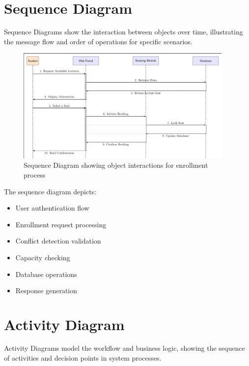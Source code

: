 \section{Sequence Diagram}

Sequence Diagrams show the interaction between objects over time, illustrating the message flow and order of operations for specific scenarios.

\begin{figure}[h]
    \centering
    \includegraphics[width=0.95\textwidth]{images/Sequence Diagram.png}
    \caption{Sequence Diagram showing object interactions for enrollment process}
    \label{fig:sequence}
\end{figure}

The sequence diagram depicts:
\begin{itemize}[leftmargin=*]
    \item User authentication flow
    \item Enrollment request processing
    \item Conflict detection validation
    \item Capacity checking
    \item Database operations
    \item Response generation
\end{itemize}

\section{Activity Diagram}

Activity Diagrams model the workflow and business logic, showing the sequence of activities and decision points in system processes.

